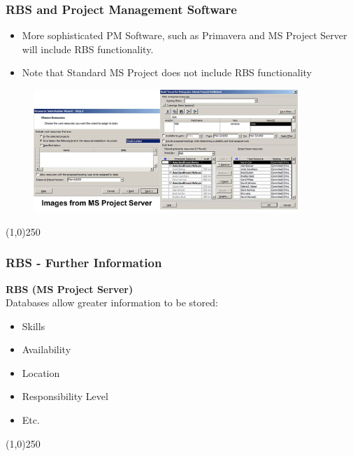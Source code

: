  
\begin{frame}
\frametitle{RBS and Project Management Software}
\begin{itemize}
	\item More sophisticated PM Software, such as Primavera and MS Project Server will include RBS functionality.
	\item Note that Standard MS Project does not include RBS functionality
\end{itemize}
\begin{figure}
	\centering
		\includegraphics[width = 10cm]{images/prjserver.jpg}
	\label{fig:msprojserver}
\end{figure}
\end{frame}\begin{center}\line(1,0){250}\end{center}


\begin{frame}
\frametitle{RBS - Further Information}
\textbf{RBS (MS Project Server)}\\
Databases allow greater information to be stored:\\
\begin{itemize}
	\item Skills
	\item Availability
	\item Location
	\item Responsibility Level
	\item Etc.
\end{itemize}
\end{frame}\begin{center}\line(1,0){250}\end{center}
 
